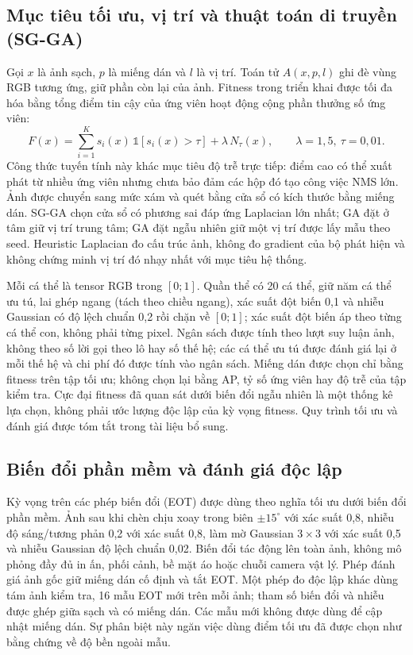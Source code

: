 \documentclass[a4paper,fleqn]{cas-dc}
\newcommand{\Ntau}{N_{\tau}}
\begin{document}
\subsection{Mục tiêu tối ưu, vị trí và thuật toán di truyền (SG-GA)}
Gọi $x$ là ảnh sạch, $p$ là miếng dán và $l$ là vị trí. Toán tử $A(x,p,l)$ ghi đè vùng RGB tương ứng, giữ phần còn lại của ảnh. Fitness trong triển khai được tối đa hóa bằng tổng điểm tin cậy của ứng viên hoạt động cộng phần thưởng số ứng viên:
\begin{equation}
F(x)=\sum_{i=1}^{K} s_i(x)\,\mathbb{1}[s_i(x)>\tau]+\lambda\,\Ntau(x),\qquad \lambda=1{,}5,\ \tau=0{,}01 .
\end{equation}
Công thức tuyến tính này khác mục tiêu độ trễ trực tiếp: điểm cao có thể xuất phát từ nhiều ứng viên nhưng chưa bảo đảm các hộp đó tạo công việc NMS lớn. Ảnh được chuyển sang mức xám và quét bằng cửa sổ có kích thước bằng miếng dán. SG-GA chọn cửa sổ có phương sai đáp ứng Laplacian lớn nhất; GA đặt ở tâm giữ vị trí trung tâm; GA đặt ngẫu nhiên giữ một vị trí được lấy mẫu theo seed. Heuristic Laplacian đo cấu trúc ảnh, không đo gradient của bộ phát hiện và không chứng minh vị trí đó nhạy nhất với mục tiêu hệ thống.

Mỗi cá thể là tensor RGB trong $[0;1]$. Quần thể có 20 cá thể, giữ năm cá thể ưu tú, lai ghép ngang (tách theo chiều ngang), xác suất đột biến 0,1 và nhiễu Gaussian có độ lệch chuẩn 0,2 rồi chặn về $[0;1]$; xác suất đột biến áp theo từng cá thể con, không phải từng pixel. Ngân sách được tính theo lượt suy luận ảnh, không theo số lời gọi theo lô hay số thế hệ; các cá thể ưu tú được đánh giá lại ở mỗi thế hệ và chi phí đó được tính vào ngân sách. Miếng dán được chọn chỉ bằng fitness trên tập tối ưu; không chọn lại bằng AP, tỷ số ứng viên hay độ trễ của tập kiểm tra. Cực đại fitness đã quan sát dưới biến đổi ngẫu nhiên là một thống kê lựa chọn, không phải ước lượng độc lập của kỳ vọng fitness. Quy trình tối ưu và đánh giá được tóm tắt trong tài liệu bổ sung.



\subsection{Biến đổi phần mềm và đánh giá độc lập}
Kỳ vọng trên các phép biến đổi (EOT) được dùng theo nghĩa tối ưu dưới biến đổi phần mềm. Ảnh sau khi chèn chịu xoay trong biên $\pm15^{\circ}$ với xác suất 0,8, nhiễu độ sáng/tương phản 0,2 với xác suất 0,8, làm mờ Gaussian $3\times3$ với xác suất 0,5 và nhiễu Gaussian độ lệch chuẩn 0,02. Biến đổi tác động lên toàn ảnh, không mô phỏng đầy đủ in ấn, phối cảnh, bề mặt áo hoặc chuỗi camera vật lý. Phép đánh giá ảnh gốc giữ miếng dán cố định và tắt EOT. Một phép đo độc lập khác dùng tám ảnh kiểm tra, 16 mẫu EOT mới trên mỗi ảnh; tham số biến đổi và nhiễu được ghép giữa sạch và có miếng dán. Các mẫu mới không được dùng để cập nhật miếng dán. Sự phân biệt này ngăn việc dùng điểm tối ưu đã được chọn như bằng chứng về độ bền ngoài mẫu.
\end{document}
